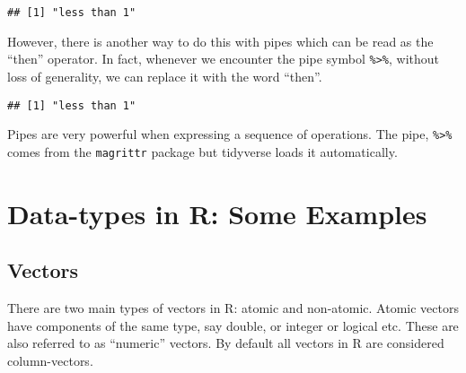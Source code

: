 \documentclass[11pt,]{article}
\newenvironment{Shaded}{\begin{snugshade}}{\end{snugshade}}
\newcommand{\KeywordTok}[1]{\textcolor[rgb]{0.13,0.29,0.53}{\textbf{#1}}}
\newcommand{\DecValTok}[1]{\textcolor[rgb]{0.00,0.00,0.81}{#1}}
\newcommand{\StringTok}[1]{\textcolor[rgb]{0.31,0.60,0.02}{#1}}
\newcommand{\CommentTok}[1]{\textcolor[rgb]{0.56,0.35,0.01}{\textit{#1}}}
\newcommand{\ControlFlowTok}[1]{\textcolor[rgb]{0.13,0.29,0.53}{\textbf{#1}}}
\newcommand{\OperatorTok}[1]{\textcolor[rgb]{0.81,0.36,0.00}{\textbf{#1}}}
\newcommand{\NormalTok}[1]{#1}
\begin{document}
\begin{verbatim}
## [1] "less than 1"
\end{verbatim}

However, there is another way to do this with pipes which can be read as
the ``then'' operator. In fact, whenever we encounter the pipe symbol
\texttt{\%\textgreater{}\%}, without loss of generality, we can replace
it with the word ``then''.

\begin{Shaded}
\end{Shaded}

\begin{verbatim}
## [1] "less than 1"
\end{verbatim}

Pipes are very powerful when expressing a sequence of operations. The
pipe, \texttt{\%\textgreater{}\%} comes from the \texttt{magrittr}
package but tidyverse loads it automatically.

\section{Data-types in R: Some
Examples}\label{data-types-in-r-some-examples}

\subsection{Vectors}\label{vectors}

There are two main types of vectors in R: atomic and non-atomic. Atomic
vectors have components of the same type, say double, or integer or
logical etc. These are also referred to as ``numeric'' vectors. By
default all vectors in R are considered column-vectors.
\end{document}
